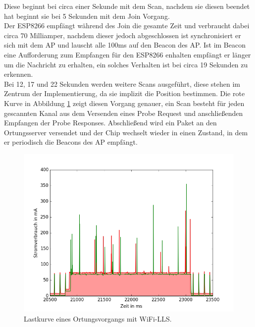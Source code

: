 Diese beginnt bei circa einer Sekunde mit dem Scan, nachdem sie diesen beendet hat beginnt sie bei 5 Sekunden mit dem Join Vorgang.\\
Der ESP8266 empfängt während des Join die gesamte Zeit und verbraucht dabei circa 70 Milliamper, nachdem dieser jedoch abgeschlossen ist synchronisiert er sich mit dem AP und lauscht alle 100ms auf den Beacon des AP.
Ist im Beacon eine Aufforderung zum Empfangen für den ESP8266 enhalten empfängt er länger um die Nachricht zu erhalten, ein solches Verhalten ist bei circa 19 Sekunden zu erkennen.\\
Bei 12, 17 und 22 Sekunden werden weitere Scans ausgeführt, diese stehen im Zentrum der Implementierung, da sie implizit die Position bestimmen.
Die rote Kurve in Abbildung \ref{fig:wifillssendv} zeigt diesen Vorgang genauer, ein Scan besteht für jeden gescannten Kanal aus dem Versenden eines Probe Request und anschließenden Empfangen der Probe Responses. 
Abschließend wird ein Paket an den Ortungsserver versendet und der Chip wechselt wieder in einen Zustand, in dem er periodisch die Beacons des AP empfängt.\\

\begin{figure}[h!]
  \centering
	\includegraphics[width=\textwidth]{plots/wifillssendv.png}
  \caption{Lastkurve eines Ortungsvorgangs mit WiFi-LLS.}
  \label{fig:wifillssendv}
\end{figure}

